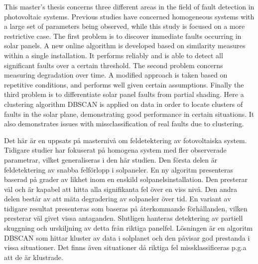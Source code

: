 \newenvironment{abstractpage}
  {\cleardoublepage\vspace*{\fill}\thispagestyle{empty}}
  {\vfill\cleardoublepage}
\newenvironment{polyAbstract}[1]
  {\bigskip\selectlanguage{#1}%
   \begin{center}\bfseries\abstractname\end{center}}
  {\par\bigskip}

\begin{abstractpage}
\begin{polyAbstract}{english}
This master's thesis concerns three different areas in the field of fault detection in photovoltaic systems.
Previous studies have concerned homogeneous systems with a large set of parameters being observed, while this study is focused on a more restrictive case.
The first problem is to discover immediate faults occurring in solar panels.
A new online algorithm is developed based on similarity measures within a single installation.
It performs reliably and is able to detect all significant faults over a certain threshold.
The second problem concerns measuring degradation over time.
A modified approach is taken based on repetitive conditions, and performs well given certain assumptions.
Finally the third problem is to differentiate solar panel faults from partial shading.
Here a clustering algorithm DBSCAN is applied on data in order to locate clusters of faults in the solar plane, demonstrating good performance in certain situations.
It also demonstrates issues with missclassification of real faults due to clustering.

\end{polyAbstract}

\begin{polyAbstract}{swedish}
Det här är en uppsats på masternivå om feldetektering av fotovoltaiska system.
Tidigare studier har fokuserat på homogena system med fler observerade parametrar, vilket generaliseras i den här studien.
Den första delen är feldetektering av snabba felförlopp i solpaneler.
En ny algoritm presenteras baserad på grader av likhet inom en enskild solpanelsinstallation.
Den presterar väl och är kapabel att hitta alla signifikanta fel över en viss nivå.
Den andra delen består av att mäta degradering av solpaneler över tid.
En variant av tidigare resultat presenteras som baseras på återkommande förhållanden, vilken presterar väl givet vissa antaganden.
Slutligen hanteras detektering av partiell skuggning och urskiljning av detta från riktiga panelfel.
Lösningen är en algoritm DBSCAN som hittar kluster av data i solplanet och den påvisar god prestanda i vissa situationer.
Det finns även situationer då riktiga fel missklassificeras p.g.a att de är klustrade.

\end{polyAbstract}
\end{abstractpage}

